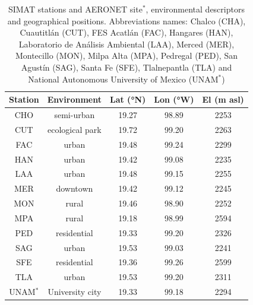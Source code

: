 \documentclass[journal=jacsat,manuscript=article]{achemso}
\begin{document}
\begin{table}[H]
  \centering
  \begin{tabular}{ccccc}
    \hline
    Station  & Environment     & Lat (°N) & Lon (°W) & El (m asl) \\ \hline
    CHO      & semi-urban      & 19.27    & 98.89    & 2253       \\
    CUT      & ecological park & 19.72    & 99.20    & 2263       \\
    FAC      & urban           & 19.48    & 99.24    & 2299       \\
    HAN      & urban           & 19.42    & 99.08    & 2235       \\
    LAA      & urban           & 19.48    & 99.15    & 2255       \\
    MER      & downtown        & 19.42    & 99.12    & 2245       \\
    MON      & rural           & 19.46    & 98.90    & 2252       \\
    MPA      & rural           & 19.18    & 98.99    & 2594       \\
    PED      & residential     & 19.33    & 99.20    & 2326       \\
    SAG      & urban           & 19.53    & 99.03    & 2241       \\
    SFE      & residential     & 19.36    & 99.26    & 2599       \\
    TLA      & urban           & 19.53    & 99.20    & 2311       \\
    UNAM$^*$ & University city & 19.33    & 99.18    & 2294       \\\hline
  \end{tabular}
  \caption{{{{SIMAT stations and AERONET site$^*$, environmental descriptors and geographical
                positions. Abbreviations names: Chalco (CHA), Cuautitlán (CUT), FES Acatlán
                (FAC), Hangares (HAN), Laboratorio de Análisis Ambiental (LAA), Merced
                (MER), Montecillo (MON), Milpa Alta (MPA), Pedregal (PED), San Agustín
                (SAG), Santa Fe (SFE), Tlalnepantla (TLA) and National Autonomous University of Mexico (UNAM$^*$)}}}}
  \label{table:stations}
\end{table}
\end{document}
